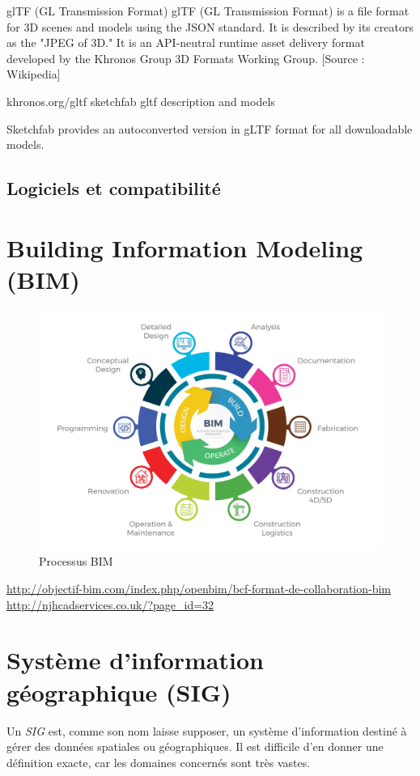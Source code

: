 glTF (GL Transmission Format)
glTF (GL Transmission Format) is a file format for 3D scenes and models using the JSON standard. It is described by its creators as the "JPEG of 3D." It is an API-neutral runtime asset delivery format developed by the Khronos Group 3D Formats Working Group. [Source : Wikipedia]

khronos.org/gltf
sketchfab gltf description and models

Sketchfab provides an autoconverted version in gLTF format for all downloadable models.

\subsection{Logiciels et compatibilité}


\section{Building Information Modeling (BIM)}

\begin{figure}
    \centering
    \includegraphics[width=\linewidth]{Figures/bim-process.jpg}
    \caption{Processus BIM}
    \label{fig:bim-process}
\end{figure}

\url{http://objectif-bim.com/index.php/openbim/bcf-format-de-collaboration-bim}
\url{http://njhcadservices.co.uk/?page_id=32}

\section{Système d'information géographique (SIG)}
Un \textit{SIG} est, comme son nom laisse supposer, un système d'information destiné à gérer des données spatiales ou géographiques. Il est difficile d'en donner une définition exacte, car les domaines concernés sont très vastes.

